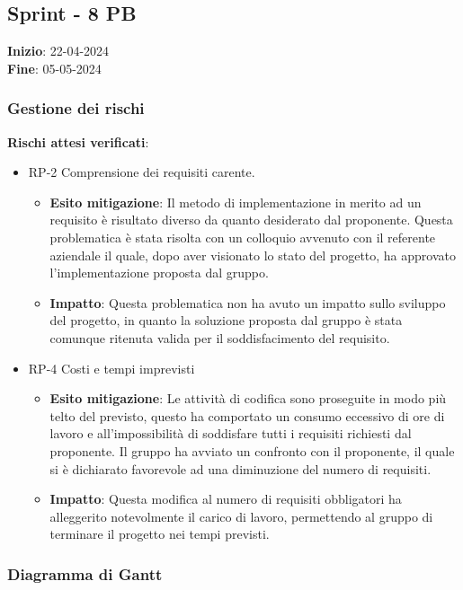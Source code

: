 \subsection{Sprint - 8 PB}
\textbf{Inizio}: 22-04-2024 \\
\textbf{Fine}: 05-05-2024

\subsubsection{Gestione dei rischi}
\textbf{Rischi attesi verificati}:

\begin{itemize}
	\item  RP-2 Comprensione dei requisiti carente.
	      \begin{itemize}
		      \item \textbf{Esito mitigazione}: Il metodo di implementazione in merito ad un requisito è risultato diverso da quanto desiderato dal proponente.
		            Questa problematica è stata risolta con un colloquio avvenuto con il referente aziendale il quale, dopo aver visionato lo stato del progetto, ha approvato l'implementazione proposta dal gruppo.
		      \item \textbf{Impatto}: Questa problematica non ha avuto un impatto sullo sviluppo del progetto, in quanto la soluzione proposta dal gruppo è stata comunque ritenuta valida per il soddisfacimento del requisito.
	      \end{itemize}
	\item RP-4 Costi e tempi imprevisti
	      \begin{itemize}
		      \item \textbf{Esito mitigazione}: Le attività di codifica sono proseguite in modo più telto del previsto, questo ha comportato un consumo eccessivo di ore di lavoro e all'impossibilità di soddisfare tutti i requisiti richiesti dal proponente.
		            Il gruppo ha avviato un confronto con il proponente, il quale si è dichiarato favorevole ad una diminuzione del numero di requisiti.
		      \item \textbf{Impatto}: Questa modifica al numero di requisiti obbligatori ha alleggerito notevolmente il carico di lavoro, permettendo al gruppo di terminare il progetto nei tempi previsti.
	      \end{itemize}
\end{itemize}

\subsubsection{Diagramma di Gantt}

